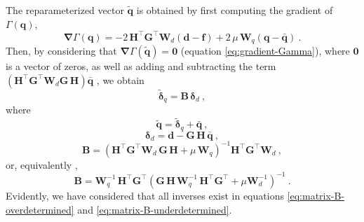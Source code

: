 \documentclass[utf8]{FrontiersinHarvard} %
\begin{document}
	The reparameterized vector $\tilde{\mathbf{q}}$ is obtained by first computing the gradient of $\Gamma(\mathbf{q})$,
	\begin{equation}
		\boldsymbol{\nabla} \Gamma(\mathbf{q}) = 
		-2 \, \mathbf{H}^{\top}\mathbf{G}^{\top} \mathbf{W}_{d} \left(\mathbf{d} - \mathbf{f} \right) +
		2 \, \mu \, \mathbf{W}_{q} \left( \mathbf{q} - \bar{\mathbf{q}} \right) \: .
		\label{eq:gradient-Gamma}
	\end{equation}
	Then, by considering that $\boldsymbol{\nabla} \Gamma(\tilde{\mathbf{q}}) = \mathbf{0}$ (equation \ref{eq:gradient-Gamma}),
	where $\mathbf{0}$ is a vector of zeros, as well as adding and subtracting the term
	$\left( \mathbf{H}^{\top}\mathbf{G}^{\top}\mathbf{W}_{d} \mathbf{G} \, \mathbf{H} \right) \bar{\mathbf{q}}$ ,
	we obtain
	\begin{equation}
		\tilde{\boldsymbol{\delta}}_{q} = \mathbf{B} \, \boldsymbol{\delta}_{d} \: ,
		\label{eq:vector-q-tilde}
	\end{equation}
	where 
	\begin{equation}
		\tilde{\mathbf{q}} = \tilde{\boldsymbol{\delta}}_{q} + \bar{\mathbf{q}} \: ,
		\label{eq:delta-q-tilde}
	\end{equation}
	\begin{equation}
		\boldsymbol{\delta}_{d} = \mathbf{d} - \mathbf{G} \, \mathbf{H} \, \bar{\mathbf{q}} \: ,
		\label{eq:delta-d}
	\end{equation}
	\begin{equation}
		\mathbf{B} = \left( \mathbf{H}^{\top} \mathbf{G}^{\top} \mathbf{W}_{d} \, \mathbf{G} \, \mathbf{H} + 
		\mu \, \mathbf{W}_{q} \right)^{-1}
		\mathbf{H}^{\top} \mathbf{G}^{\top} \mathbf{W}_{d} \: ,
		\label{eq:matrix-B-overdetermined}
	\end{equation}
	or, equivalently \cite[][p. 62]{menke2018},
	\begin{equation}
		\mathbf{B} = \mathbf{W}_{q}^{-1} \, \mathbf{H}^{\top} \mathbf{G}^{\top}
		\left( \mathbf{G} \, \mathbf{H} \, \mathbf{W}_{q}^{-1} \,
		\mathbf{H}^{\top}\mathbf{G}^{\top} + \mu \mathbf{W}_{d}^{-1} \right)^{-1} \: .
		\label{eq:matrix-B-underdetermined}
	\end{equation}
	Evidently, we have considered that all inverses exist in equations \ref{eq:matrix-B-overdetermined} and \ref{eq:matrix-B-underdetermined}.
	
\end{document}
